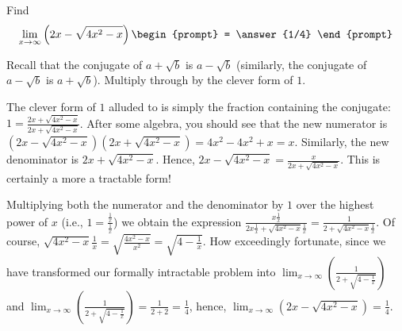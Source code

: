 \documentclass{ximera}
\author{Matthew Carr}
\begin{document}
\begin{exercise}



Find
\[
\lim_{x\to\infty}\left(2x-\sqrt{4x^2-x}\right)
\begin{prompt}
= \answer{1/4}
\end{prompt}
\]

\begin{hint}
Recall that the conjugate of $a+\sqrt{b}$ is $a-\sqrt{b}$ (similarly, the conjugate of $a-\sqrt{b}$ is $a+\sqrt{b}$). Multiply through by the clever form of $1$.
\end{hint}
\begin{hint}
The clever form of $1$ alluded to is simply the fraction containing the conjugate: $1=\frac{2x+\sqrt{4x^2-x}}{2x+\sqrt{4x^2-x}}$. After some algebra, you should see that the new numerator is $\left(2x-\sqrt{4x^2-x}\right)\left(2x+\sqrt{4x^2-x}\right)=4x^2-4x^2+x=x$. Similarly, the new denominator is $2x+\sqrt{4x^2-x}$. Hence, $2x-\sqrt{4x^2-x}=\frac{x}{2x+\sqrt{4x^2-x}}$. This is certainly a more a tractable form! 
\end{hint}
\begin{hint}
Multiplying both the numerator and the denominator by $1$ over the highest power of $x$ (i.e., $1=\frac{\frac{1}{x}}{\frac{1}{x}}$) we obtain the expression $\frac{x\frac{1}{x}}{2x\frac{1}{x}+\sqrt{4x^2-x}\frac{1}{x}}=\frac{1}{2+\sqrt{4x^2-x}\frac{1}{x}}$. Of course, $\sqrt{4x^2-x}\frac{1}{x}=\sqrt{\frac{4x^2-x}{x^2}}=\sqrt{4-\frac{1}{x}}$. How exceedingly fortunate, since we have transformed our formally intractable problem into $\lim_{x\to\infty}\left(\frac{1}{2+\sqrt{4-\frac{1}{x}}}\right)$ and $\lim_{x\to\infty}\left(\frac{1}{2+\sqrt{4-\frac{1}{x}}}\right)=\frac{1}{2+2}=\frac{1}{4}$, hence, $\lim_{x\to\infty}\left(2x-\sqrt{4x^2-x}\right)=\frac{1}{4}$.
\end{hint}
\end{exercise}
\end{document}
